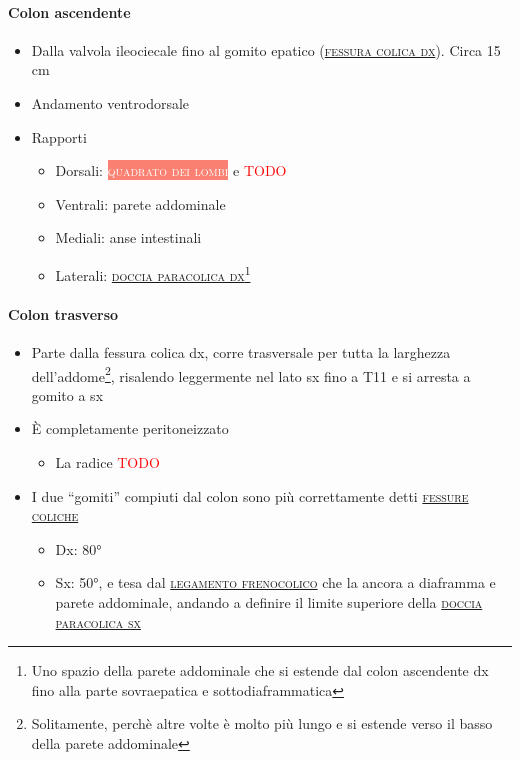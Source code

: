 \documentclass[italian,]{article}
\providecommand{\tightlist}{%
  \setlength{\itemsep}{0pt}\setlength{\parskip}{0pt}}
\newcommand{\mus}[1]{\colorbox{Salmon}{\textcolor{white}{\textsc{#1}}}}
\renewcommand{\a}[1]{\underline{\textsc{#1}}}
\newcommand{\TODO}[1]{\textcolor{red}{\textsf{\footnotesize{TODO #1}}}} %
\begin{document}
\hypertarget{colon-ascendente}{%
\paragraph{Colon ascendente}\label{colon-ascendente}}

\begin{itemize}
\tightlist
\item
  Dalla valvola ileociecale fino al gomito epatico
  (\a{fessura colica dx}). Circa 15 cm
\item
  Andamento ventrodorsale
\item
  Rapporti

  \begin{itemize}
  \tightlist
  \item
    Dorsali: \mus{quadrato dei lombi} e \TODO{}
  \item
    Ventrali: parete addominale
  \item
    Mediali: anse intestinali
  \item
    Laterali: \a{doccia paracolica dx}\footnote{Uno spazio della parete
      addominale che si estende dal colon ascendente dx fino alla parte
      sovraepatica e sottodiaframmatica}
  \end{itemize}
\end{itemize}

\hypertarget{colon-trasverso}{%
\paragraph{Colon trasverso}\label{colon-trasverso}}

\begin{itemize}
\tightlist
\item
  Parte dalla fessura colica dx, corre trasversale per tutta la
  larghezza dell'addome\footnote{Solitamente, perchè altre volte è molto
    più lungo e si estende verso il basso della parete addominale},
  risalendo leggermente nel lato sx fino a T11 e si arresta a gomito a
  sx
\item
  È completamente peritoneizzato

  \begin{itemize}
  \tightlist
  \item
    La radice \TODO{}
  \end{itemize}
\item
  I due ``gomiti'' compiuti dal colon sono più correttamente detti
  \a{fessure coliche}

  \begin{itemize}
  \tightlist
  \item
    Dx: 80°
  \item
    Sx: 50°, e tesa dal \a{legamento frenocolico} che la ancora a
    diaframma e parete addominale, andando a definire il limite
    superiore della \a{doccia paracolica sx}
  \end{itemize}
\end{itemize}
\end{document}
